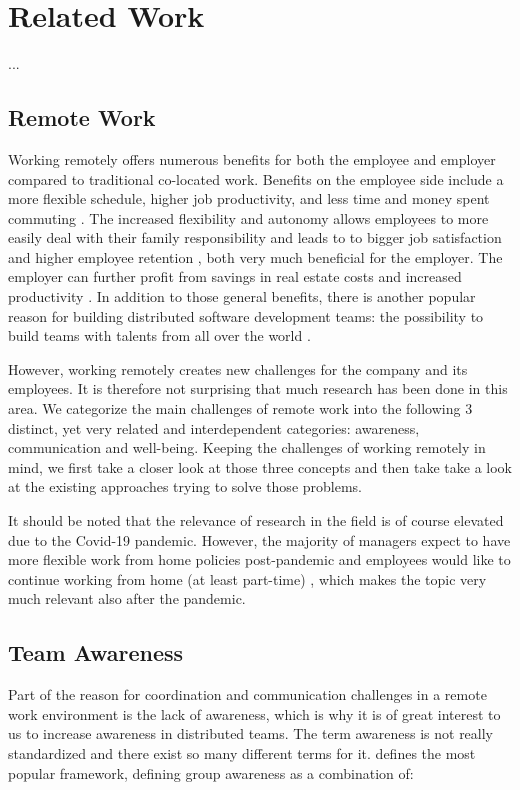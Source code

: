 \chapter{Related Work}

...

\section{Remote Work}
Working remotely offers numerous benefits for both the employee and employer compared to traditional co-located work. Benefits on the employee side include a more flexible schedule, higher job productivity, and less time and money spent commuting \cite{flores2019understanding, mulki2009set}. The increased flexibility and autonomy allows employees to more easily deal with their family responsibility and leads to to bigger job satisfaction and higher employee retention \cite{mulki2009set, gajendran2007good, madsen2011benefits}, both very much beneficial for the employer. The employer can further profit from savings in real estate costs and increased productivity \cite{mulki2009set}. In addition to those general benefits, there is another popular reason for building distributed software development teams: the possibility to build teams with talents from all over the world \cite{carmel1999global}. 

However, working remotely creates new challenges for the company and its employees. It is therefore not surprising that much research has been done in this area. We categorize the main challenges of remote work into the following 3 distinct, yet very related and interdependent categories: awareness, communication and well-being. Keeping the challenges of working remotely in mind, we first take a closer look at those three concepts and then take take a look at the existing approaches trying to solve those problems.

It should be noted that the relevance of research in the field is of course elevated due to the Covid-19 pandemic. However, the majority of managers expect to have more flexible work from home policies post-pandemic and employees would like to continue working from home (at least part-time) \cite{msworkindexconnection}, which makes the topic very much relevant also after the pandemic. 

\section{Team Awareness}
Part of the reason for coordination and communication challenges in a remote work environment is the lack of awareness, which is why it is of great interest to us to increase awareness in distributed teams. The term awareness is not really standardized and there exist so many different terms for it. \cite{gutwin1996workspace} defines the most popular framework, defining group awareness as a combination of:


